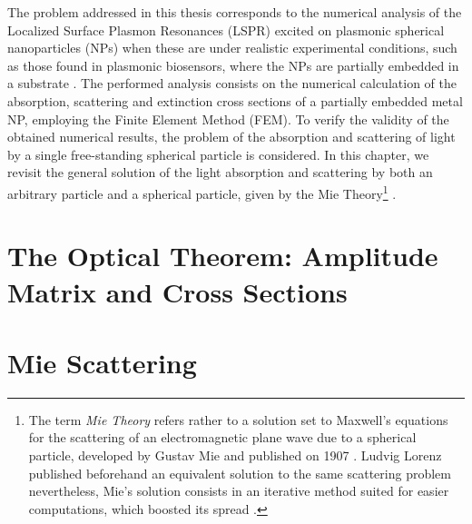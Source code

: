 \documentclass[11pt]{Latex/Classes/PhDthesisPSnPDF}
\begin{document}
  The problem addressed in this thesis corresponds to the numerical analysis of the Localized Surface Plasmon Resonances (LSPR)  excited on plasmonic spherical nanoparticles (NPs) when these are under realistic experimental conditions, such as those found in plasmonic biosensors, where the NPs are partially embedded in a substrate \cite{moirangthem_enhanced_2012}. The performed analysis consists on the numerical calculation of the absorption, scattering and extinction  cross sections of a partially embedded metal NP, employing the Finite Element Method (FEM). To verify the validity of the obtained numerical results, the problem of the absorption and scattering of light by a single free-standing spherical particle is considered. In this chapter, we revisit the general solution of the light absorption and scattering by both an arbitrary particle and a spherical particle, given by the Mie Theory\footnote{The term \emph{Mie Theory} refers rather to a solution set to Maxwell's equations for the scattering of an electromagnetic plane wave due to a spherical particle, developed by Gustav Mie and published on 1907 \cite{mie_beitrage_1908}. Ludvig Lorenz published beforehand an equivalent solution to the same scattering problem nevertheless, Mie's solution consists in an iterative method suited for easier computations, which boosted its spread \cite{horvath_gustav_2009}. } \cite{bohren_absorption_1983}.

	\section{The Optical Theorem: Amplitude Matrix and Cross Sections}
	 \label{s:AmpMatCrossSect}
	 

	\section{Mie Scattering}
	  \label{s:Mie}
\end{document}
